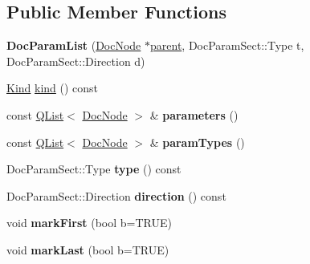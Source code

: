 \subsection*{Public Member Functions}
\begin{DoxyCompactItemize}
\item 
\mbox{\label{class_doc_param_list_a24cfde49c6be5a456c6ed4de83bd8beb}} 
{\bfseries Doc\+Param\+List} (\mbox{\hyperlink{class_doc_node}{Doc\+Node}} $\ast$\mbox{\hyperlink{class_doc_node_a73e8ad29a91cfceb0968eb00db71a23d}{parent}}, Doc\+Param\+Sect\+::\+Type t, Doc\+Param\+Sect\+::\+Direction d)
\item 
\mbox{\hyperlink{class_doc_node_aebd16e89ca590d84cbd40543ea5faadb}{Kind}} \mbox{\hyperlink{class_doc_param_list_a455e9aa8d93b2e62376ce37ba1dc1005}{kind}} () const
\item 
\mbox{\label{class_doc_param_list_a607d79c8a9676bcb301813e5bd098752}} 
const \mbox{\hyperlink{class_q_list}{Q\+List}}$<$ \mbox{\hyperlink{class_doc_node}{Doc\+Node}} $>$ \& {\bfseries parameters} ()
\item 
\mbox{\label{class_doc_param_list_a1de2caf710c83eeaaf431e2f9b7f22e5}} 
const \mbox{\hyperlink{class_q_list}{Q\+List}}$<$ \mbox{\hyperlink{class_doc_node}{Doc\+Node}} $>$ \& {\bfseries param\+Types} ()
\item 
\mbox{\label{class_doc_param_list_a6c795a79c11468fb1d8ce3dab41534f3}} 
Doc\+Param\+Sect\+::\+Type {\bfseries type} () const
\item 
\mbox{\label{class_doc_param_list_ac45275b55efab9d6a60049f6d6dc7679}} 
Doc\+Param\+Sect\+::\+Direction {\bfseries direction} () const
\item 
\mbox{\label{class_doc_param_list_a6b3e3e25859cc2d76b312b988c018d08}} 
void {\bfseries mark\+First} (bool b=T\+R\+UE)
\item 
\mbox{\label{class_doc_param_list_a89fc37af294659364193e14680065668}} 
void {\bfseries mark\+Last} (bool b=T\+R\+UE)
\item 
\mbox{\label{class_doc_param_list_a60ad28c13ad20d76776a6bacd3b3a412}} 

\end{DoxyCompactItemize}

